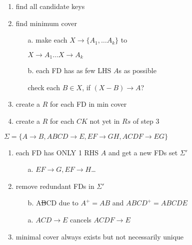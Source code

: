 \begin{minipage}{0.5\linewidth}
\begin{enumerate}
\item\label{item:5} find all candidate keys
\item find minimum cover
\begin{enumerate}[leftmargin=0pt]
\item[a.] make each $X\rightarrow \{A_{1},\ldots A_{k}\}$ to
\item[] $X\rightarrow A_{1}\ldots X\rightarrow A_{k}$
\item[b.] each FD has as few LHS $A$s as possible
\item[]check each $B \in X$, if $(X-B) \rightarrow A$?
\end{enumerate}
\item create a $R$ for each FD in min cover
\item create a $R$ for each $CK$ not yet in $Rs$ of step 3
\end{enumerate}
\end{minipage}
\begin{minipage}{0.5\linewidth}
$\Sigma=\{A\rightarrow B,ABCD\rightarrow E,EF\rightarrow GH,ACDF\rightarrow EG\}$
\begin{enumerate}
\item each FD has ONLY 1 RHS $A$ and get a new FDs set $\Sigma'$
  \begin{enumerate}[leftmargin=2pt]
  \item[a.] $EF\rightarrow G,EF\rightarrow H$\ldots
  \end{enumerate}
\item remove redundant FDs in $\Sigma'$
  \begin{enumerate}[leftmargin=2pt]
  \setcounter{enumi}{2}
  \item[b.] A\st{B}CD due to $A^{+} = AB$ and $ABCD^{+}=ABCDE$
  \item[a.] $ACD\rightarrow E$ cancels $ACDF\rightarrow E$
  \end{enumerate}
\item minimal cover always exists but not necessarily unique
\end{enumerate}
\end{minipage}
